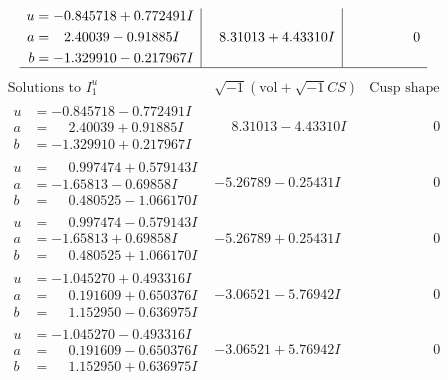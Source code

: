 \documentclass[1p]{elsarticle_modified}
\theoremstyle{definition}
\newcommand{\I}{\sqrt{-1}}
\begin{document}
$$\begin{array}{c|c|c}
\begin{aligned}
u &= -0.845718 + 0.772491 I \\
a &= \phantom{-}2.40039 - 0.91885 I \\
b &= -1.329910 - 0.217967 I\end{aligned}
 & \phantom{-}8.31013 + 4.43310 I & \phantom{-0.000000 } 0\\
 \hline 
 \end{array}$$\newpage$$\begin{array}{c|c|c}  
\text{Solutions to }I^u_{1}& \I (\text{vol} + \sqrt{-1}CS) & \text{Cusp shape}\\
 \hline 
\begin{aligned}
u &= -0.845718 - 0.772491 I \\
a &= \phantom{-}2.40039 + 0.91885 I \\
b &= -1.329910 + 0.217967 I\end{aligned}
 & \phantom{-}8.31013 - 4.43310 I & \phantom{-0.000000 } 0 \\ \hline\begin{aligned}
u &= \phantom{-}0.997474 + 0.579143 I \\
a &= -1.65813 - 0.69858 I \\
b &= \phantom{-}0.480525 - 1.066170 I\end{aligned}
 & -5.26789 - 0.25431 I & \phantom{-0.000000 } 0 \\ \hline\begin{aligned}
u &= \phantom{-}0.997474 - 0.579143 I \\
a &= -1.65813 + 0.69858 I \\
b &= \phantom{-}0.480525 + 1.066170 I\end{aligned}
 & -5.26789 + 0.25431 I & \phantom{-0.000000 } 0 \\ \hline\begin{aligned}
u &= -1.045270 + 0.493316 I \\
a &= \phantom{-}0.191609 + 0.650376 I \\
b &= \phantom{-}1.152950 - 0.636975 I\end{aligned}
 & -3.06521 - 5.76942 I & \phantom{-0.000000 } 0 \\ \hline\begin{aligned}
u &= -1.045270 - 0.493316 I \\
a &= \phantom{-}0.191609 - 0.650376 I \\
b &= \phantom{-}1.152950 + 0.636975 I\end{aligned}
 & -3.06521 + 5.76942 I & \phantom{-0.000000 } 0 \\ \hline\begin{aligned}

\end{aligned}
\end{array}$$
\end{document}
